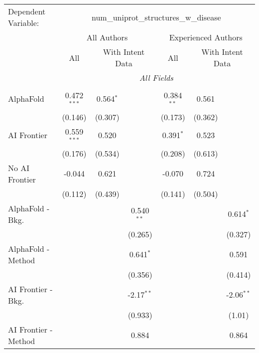 \begingroup
\centering
\begin{tabular}{lcccccc}
   \tabularnewline \midrule \midrule
   Dependent Variable: & \multicolumn{6}{c}{num\_uniprot\_structures\_w\_disease}\\
 & \multicolumn{3}{c}{All Authors} & \multicolumn{3}{c}{Experienced Authors} \\
\cmidrule(lr){2-4} \cmidrule(lr){5-7}
 & \multicolumn{1}{c}{All} & \multicolumn{2}{c}{With Intent Data} & \multicolumn{1}{c}{All} & \multicolumn{2}{c}{With Intent Data} \\
\cmidrule(lr){2-2} \cmidrule(lr){3-4} \cmidrule(lr){5-5} \cmidrule(lr){6-7}
 & \multicolumn{6}{c}{\textit{All Fields}} \\ \\
   AlphaFold               & 0.472$^{***}$ & 0.564$^{*}$ &              & 0.384$^{**}$ & 0.561   &   \\   
                           & (0.146)       & (0.307)     &              & (0.173)      & (0.362) &   \\   
   AI Frontier             & 0.559$^{***}$ & 0.520       &              & 0.391$^{*}$  & 0.523   &   \\   
                           & (0.176)       & (0.534)     &              & (0.208)      & (0.613) &   \\   
   No AI Frontier          & -0.044        & 0.621       &              & -0.070       & 0.724   &   \\   
                           & (0.112)       & (0.439)     &              & (0.141)      & (0.504) &   \\   
   AlphaFold - Bkg.        &               &             & 0.540$^{**}$ &              &         & 0.614$^{*}$\\   
                           &               &             & (0.265)      &              &         & (0.327)\\   
   AlphaFold - Method      &               &             & 0.641$^{*}$  &              &         & 0.591\\   
                           &               &             & (0.356)      &              &         & (0.414)\\   
   AI Frontier - Bkg.      &               &             & -2.17$^{**}$ &              &         & -2.06$^{**}$\\   
                           &               &             & (0.933)      &              &         & (1.01)\\   
   AI Frontier - Method    &               &             & 0.884        &              &         & 0.864\\   

\end{tabular}
